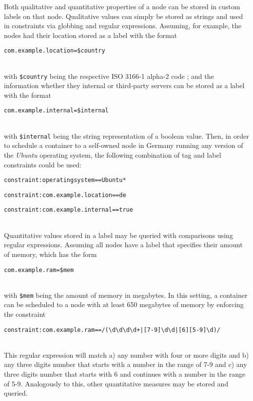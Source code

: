     Both qualitative and quantitative properties of a node can be stored in custom labels on that node.
    Qualitative values can simply be stored as strings and used in constraints via globbing and regular expressions. Assuming, for example, the nodes had their location stored as a label with the format
    \\ [0.5ex]
    \centerline{\texttt{com.example.location=\$country}}
    \\ [0.5ex]
    with \texttt{\$country} being the respective ISO 3166-1 alpha-2 code \cite{Standardization2013De}; and the information whether they internal or third-party servers can be stored as a label with the format
    \\ [0.5ex]
    \centerline{\texttt{com.example.internal=\$internal}}
    \\ [0.5ex]
    with \texttt{\$internal} being the string representation of a boolean value. Then, in order to schedule a container to a self-owned node in Germany running any version of the \emph{Ubuntu} operating system, the following combination of tag and label constraints could be used:
    \\ [0.5ex]
    \centerline{\texttt{constraint:operatingsystem==Ubuntu*}}
    \centerline{\texttt{constraint:com.example.location==de}}
    \centerline{\texttt{constraint:com.example.internal==true}}
    \\ [0.5ex]
    Quantitative values stored in a label may be queried with comparisons using regular expressions. Assuming all nodes have a label that specifies their amount of memory, which has the form
    \\ [0.5ex]
    \centerline{\texttt{com.example.ram=\$mem}}
    \\ [0.5ex]
    with \texttt{\$mem} being the amount of memory in megabytes. In this setting, a container can be scheduled to a node with at least 650 megabytes of memory by enforcing the constraint
    \\ [0.5ex]
    \centerline{\texttt{constraint:com.example.ram==/({\textbackslash}d{\textbackslash}d{\textbackslash}d{\textbackslash}d+|[7-9]{\textbackslash}d{\textbackslash}d|[6][5-9]{\textbackslash}d)/}}
    \\ [0.5ex]
    This regular expression will match a) any number with four or more digits and b) any three digits number that starts with a number in the range of 7-9 and c) any three digits number that starts with 6 and continues with a number in the range of 5-9. Analogously to this, other quantitative measures may be stored and queried.

